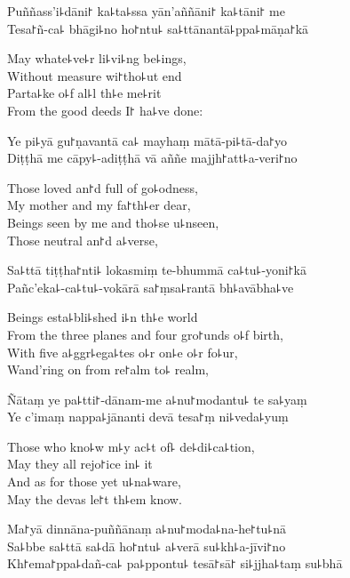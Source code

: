 Puññass'i꜕dāni꜓ ka꜕ta꜕ssa yān'aññāni꜓ ka꜕tāni꜓ me\\
Tesa꜓ñ-ca꜕ bhāgi꜕no ho꜓ntu꜕ sa꜕ttānantā꜕ppa꜕māṇa꜓kā

\begin{english}
  May whate꜕ve꜕r li꜕vi꜕ng be꜕ings,\\
  Without measure wi꜓tho꜕ut end\\
  Parta꜕ke o꜕f al꜕l th꜕e me꜕rit\\
  From the good deeds I꜓ ha꜕ve done:
\end{english}

Ye pi꜕yā gu꜓ṇavantā ca꜕ mayhaṃ mātā-pi꜕tā-da꜓yo\\
Diṭṭhā me cāpy꜕-adiṭṭhā vā aññe majjh꜓att꜕a-veri꜓no

\begin{english}
  Those loved an꜓d full of go꜕odness,\\
  My mother and my fa꜓th꜕er dear,\\
  Beings seen by me and tho꜕se u꜕nseen,\\
  Those neutral an꜓d a꜕verse,
\end{english}

Sa꜕ttā tiṭṭha꜓nti꜕ lokasmiṃ te-bhummā ca꜕tu꜕-yoni꜓kā\\
Pañc'eka꜕-ca꜕tu꜕-vokārā sa꜓ṃsa꜕rantā bh꜕avābha꜕ve

\begin{english}
  Beings esta꜕bli꜕shed i꜕n th꜕e world\\
  From the three planes and four gro꜓unds o꜕f birth,\\
  With five a꜕ggr꜕ega꜕tes o꜕r on꜕e o꜕r fo꜕ur,\\
  Wand'ring on from re꜓alm to꜕ realm,
\end{english}

Ñātaṃ ye pa꜕tti꜓-dānam-me a꜕nu꜓modantu꜕ te sa꜕yaṃ\\
Ye c'imaṃ nappa꜕jānanti devā tesa꜓ṃ ni꜕veda꜕yuṃ

\begin{english}
  Those who kno꜕w m꜕y ac꜕t of꜕ de꜕di꜕ca꜕tion,\\
  May they all rejo꜓ice in꜕ it\\
  And as for those yet u꜕na꜕ware,\\
  May the devas le꜓t th꜕em know.
\end{english}

Ma꜓yā dinnāna-puññānaṃ a꜕nu꜓moda꜕na-he꜓tu꜕nā\\
Sa꜕bbe sa꜕ttā sa꜕dā ho꜓ntu꜕ a꜕verā su꜕kh꜕a-jīvi꜓no\\
Kh꜓ema꜓ppa꜕dañ-ca꜕ pa꜕ppontu꜕ tesā꜓sā꜓ si꜕jjha꜕taṃ su꜕bhā

